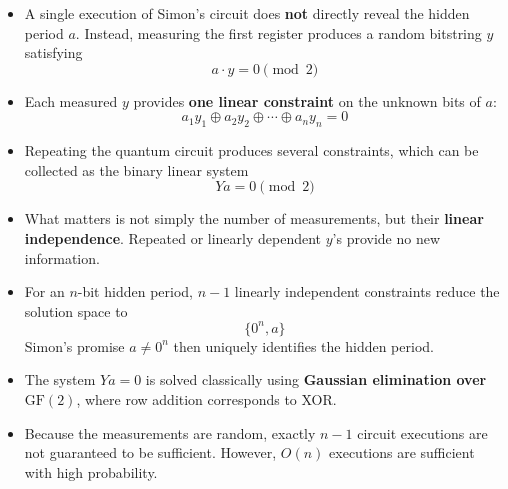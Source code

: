 \highspace
\begin{takeawaysbox}
    \begin{itemize}
        \item A single execution of Simon's circuit does \textbf{not} directly
            reveal the hidden period $a$. Instead, measuring the first register
            produces a random bitstring $y$ satisfying
            \begin{equation*}
                a \cdot y = 0 \pmod 2
            \end{equation*}

        \item Each measured $y$ provides \textbf{one linear constraint} on
            the unknown bits of $a$:
            \begin{equation*}
                a_1y_1 \oplus a_2y_2 \oplus \cdots \oplus a_ny_n = 0
            \end{equation*}

        \item Repeating the quantum circuit produces several constraints,
            which can be collected as the binary linear system
            \begin{equation*}
                Ya = 0 \pmod 2
            \end{equation*}

        \item What matters is not simply the number of measurements, but
            their \textbf{linear independence}. Repeated or linearly dependent
            $y$'s provide no new information.

        \item For an $n$-bit hidden period, $n-1$ linearly independent
            constraints reduce the solution space to
            \begin{equation*}
                \{0^n,a\}
            \end{equation*}
            Simon's promise $a\neq0^n$ then uniquely identifies the hidden
            period.

        \item The system $Ya=0$ is solved classically using
            \textbf{Gaussian elimination over $\mathrm{GF}(2)$}, where row
            addition corresponds to XOR.

        \item Because the measurements are random, exactly $n-1$ circuit
            executions are not guaranteed to be sufficient. However,
            $O(n)$ executions are sufficient with high probability.


\end{itemize}
\end{takeawaysbox}
